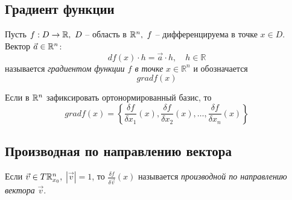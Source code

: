 \subsection{Градиент функции}

\begin{definition}
    Пусть $f:D\rightarrow \mathbb{R}, \ D$ -- область в $\mathbb{R}^n, \ f$ -- дифференцируема в точке $x \in D$. Вектор $\vec{a} \in \mathbb{R}^n$:
    \[
        df(x)\cdot h = \vec{a} \cdot h, \quad h \in \mathbb{R}
    \]
    называется \emph{градиентом функции $f$ в точке} $x \in \mathbb{R}^n$ и обозначается
    \[
        gradf(x)
    \]

    Если в $\mathbb{R}^n$ зафиксировать ортонормированный базис, то
    \[
        gradf(x) = \left\{\frac{\delta f}{\delta x_1}(x),\frac{\delta f}{\delta x_2}(x),\ldots,\frac{\delta f}{\delta x_n}(x)\right\}
    \]
\end{definition}

\subsection{Производная по направлению вектора}

\begin{definition}
    Если $ \vec{v}\in T\mathbb{R}_{x_0}^n, $ $ |\vec{v}| = 1 $, то $ \frac{\delta f}{\delta \vec{v}}(x) $ называется \emph{производной по направлению вектора} $ \vec{v} $.
\end{definition}